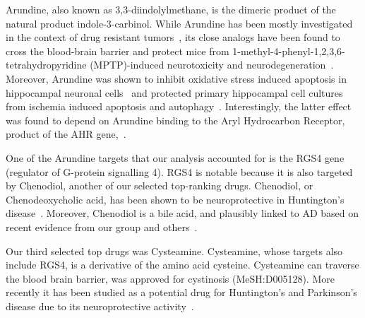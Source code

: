 \documentclass[letterpaper]{article}
\begin{document}
Arundine, also known as 3,3-diindolylmethane, is the dimeric product of the
natural product indole-3-carbinol.  While Arundine has been mostly
investigated in the context of drug resistant tumors~\citep{Biersack2020}, its
close analogs have been found to cross the blood-brain barrier and protect
mice from 1-methyl-4-phenyl-1,2,3,6-tetrahydropyridine (MPTP)-induced neurotoxicity and
neurodegeneration~\citep{DeMiranda2013}.
Moreover, Arundine was shown to inhibit oxidative stress induced apoptosis in
hippocampal neuronal cells~\citep{Lee2019} and protected primary hippocampal
cell cultures from ischemia induced apoptosis and
autophagy~\citep{Rzemieniec2019}.  Interestingly, the latter effect was found
to depend on Arundine binding to the Aryl Hydrocarbon Receptor, product of the
AHR gene,~\citep{Rzemieniec2019}.

One of the Arundine targets that our analysis accounted for is the RGS4 gene
(regulator of G-protein signalling 4). RGS4 is notable because it is also
targeted by Chenodiol, another of our selected top-ranking drugs.  Chenodiol,
or Chenodeoxycholic acid, has been shown to be neuroprotective in Huntington's
disease~\citep{Keene2002}.  Moreover, Chenodiol is a bile acid, and plausibly
linked to AD based on recent evidence from our group and
others~\citep{Varma2021,Baloni2020}.

Our third selected top drugs was Cysteamine.  Cysteamine, whose targets also
include RGS4, is a derivative of the amino acid cysteine.  Cysteamine can
traverse the blood brain barrier, was approved for cystinosis (MeSH:D005128).
More recently it has been studied as a potential drug for Huntington's and
Parkinson's disease due to its neuroprotective
activity~\citep{Besouw2013,Paul2019}.
\end{document}
